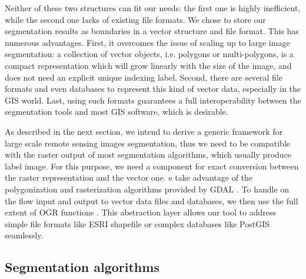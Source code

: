 \documentclass{josis}
\begin{document}
Neither of these two structures can fit our needs: the first one is
highly inefficient, while the second one lacks of existing file
formats. We chose to store our segmentation results as boundaries in a
vector structure and file format. This has numerous advantages. First,
it overcomes the issue of scaling up to large image segmentation: a
collection of vector objects, i.e. polygons or multi-polygons, is a
compact representation which will grow linearly with the size of the
image, and does not need an explicit unique indexing label. Second,
there are several file formats and even databases to represent this
kind of vector data, especially in the GIS world. Last, using such
formats guarantees a full interoperability between the segmentation
tools and most GIS software, which is desirable.

As described in the next section, we intend to derive a generic
framework for large scale remote sensing images segmentation, thus we
need to be compatible with the raster output of most segmentation
algorithms, which usually produce label image. For this purpose, we
need a component for exact conversion between the raster
representation and the vector one. e take advantage of the
polygonization and rasterization algorithms provided by GDAL
\cite{}. To handle on the flow input and output to vector data files
and databases, we then use the full extent of OGR functions
\cite{}. This abstraction layer allows our tool to address
simple file formats like ESRI shapefile or complex databases like
PostGIS seamlessly.

\subsection{Segmentation algorithms}
\end{document}
